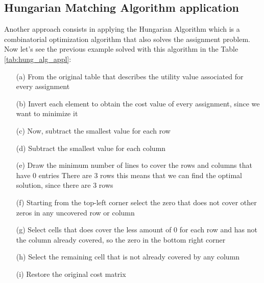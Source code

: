 \subsection{Hungarian Matching Algorithm application}
Another approach consists in applying the Hungarian Algorithm which is a combinatorial optimization algorithm that also solves the assignment problem.\\
Now let's see the previous example solved with this algorithm in the Table \ref{tab:hung_alg_appl}: 
\begin{enumerate}
  \item[(a)] From the original table that describes the utility value associated for every assignment
  \item[(b)] Invert each element to obtain the cost value of every assignment, since we want to minimize it 
  \item[(c)] Now, subtract the smallest value for each row
  \item[(d)] Subtract the smallest value for each column 
  \item[(e)] Draw the minimum number of lines to cover the rows and columns that have 0 entries
            There are 3 rows this means that we can find the optimal solution, since there are 3 rows
  \item[(f)] Starting from the top-left corner select the zero that does not cover other zeros in any uncovered row or column
  \item[(g)] Select cells that does cover the less amount of 0 for each row and has not the column already covered, so the zero in the bottom right corner
  \item[(h)] Select the remaining cell that is not already covered by any column
  \item[(i)] Restore the original cost matrix 
\end{enumerate}

